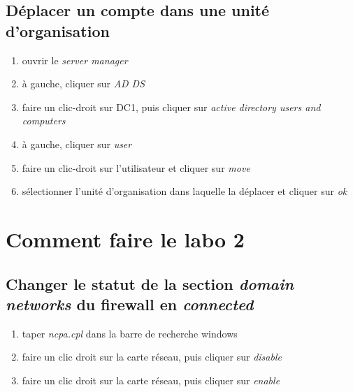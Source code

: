 \documentclass[a4paper]{article}
\begin{document}
\subsection{Déplacer un compte dans une unité d'organisation}



\begin{enumerate}
    \item ouvrir le \textit{server manager}
    \item à gauche, cliquer sur \textit{AD DS}
    \item faire un clic-droit sur DC1, puis cliquer sur \textit{active directory users and computers}
    \item à gauche, cliquer sur \textit{user}
    \item faire un clic-droit sur l'utilisateur et cliquer sur \textit{move}
    \item sélectionner l'unité d'organisation dans laquelle la déplacer et cliquer sur \textit{ok}
\end{enumerate}















\section{Comment faire le labo 2}





\subsection{Changer le statut de la section \textit{domain networks} du firewall en \textit{connected}}



\begin{enumerate}
    \item taper \textit{ncpa.cpl} dans la barre de recherche windows
    \item faire un clic droit sur la carte réseau, puis cliquer sur \textit{disable}
    \item faire un clic droit sur la carte réseau, puis cliquer sur \textit{enable}
\end{enumerate}
\end{document}
